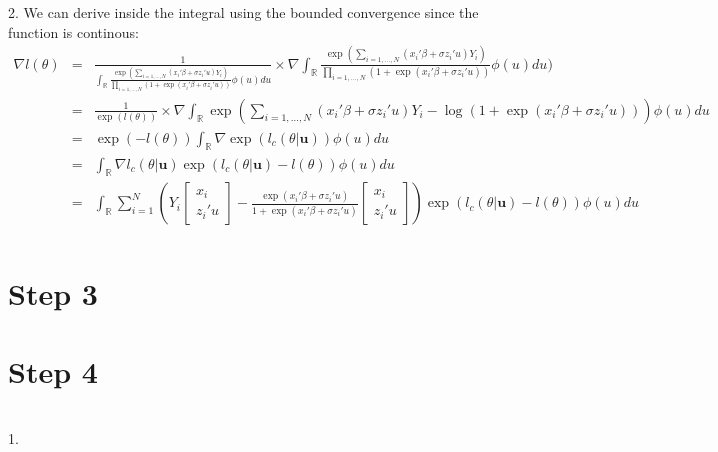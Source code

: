 	2.  We can derive inside the integral using the bounded convergence since the function is continous:
	\begin{eqnarray*}
		\nabla l(\theta)&=& \frac{1}{\int_{\mathbb{R}} \frac{\exp(\sum_{i=1,\dots,N}(x_i' \beta + \sigma z_i'u) Y_i)}{\prod_{i=1,\dots,N}(1+\exp(x_i' \beta + \sigma z_i'u))} \phi(u) du} \times \nabla \int_{\mathbb{R}} \frac{\exp(\sum_{i=1,\dots,N}(x_i' \beta + \sigma z_i'u) Y_i)}{\prod_{i=1,\dots,N}(1+\exp(x_i' \beta + \sigma z_i'u))} \phi(u) du)\\
							&=& \frac{1}{\exp(l(\theta))}\times \nabla \int_{\mathbb{R}} \exp(\sum_{i=1,\dots,N}(x_i' \beta + \sigma z_i'u) Y_i-\log(1+\exp(x_i' \beta + \sigma z_i'u)))\phi(u)du \\
							&=& \exp(-l(\theta)) \int_{\mathbb{R}} \nabla \exp(l_c(\theta\vert \textbf{u})) \phi(u) du\\
							&=& \int_{\mathbb{R}} \nabla l_c(\theta\vert \textbf{u}) \exp (l_c(\theta\vert \textbf{u})-l(\theta)) \phi(u)du\\
							&=& \int_{\mathbb{R}} \sum_{i=1}^{N} (Y_i\begin{bmatrix}
								x_i\\
								z_i'u
							\end{bmatrix}-\frac{\exp(x_i' \beta + \sigma z_i'u)}{1+\exp(x_i' \beta + \sigma z_i'u)}\begin{bmatrix}
							x_i\\
							z_i'u
						\end{bmatrix}) \exp (l_c(\theta\vert \textbf{u})-l(\theta)) \phi(u)du\\
	\end{eqnarray*}
	
	\section*{Step 3}
	
	\section*{Step 4}
	~\\
	
	1. 
	
